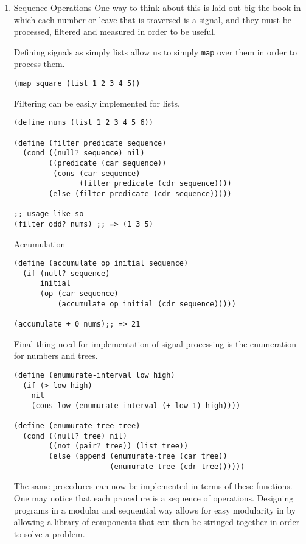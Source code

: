 \documentclass[11pt]{article}
\begin{document}
\begin{enumerate}
\item Sequence Operations
\label{sec:org70e3ef4}
One way to think about this is laid out big the book in which each
number or leave that is traversed is a signal, and they must be
processed, filtered and measured in order to be useful.

Defining signals as simply lists allow us to simply \texttt{map} over them in
order to process them.

\begin{verbatim}
(map square (list 1 2 3 4 5))
\end{verbatim}

Filtering can be easily implemented for lists.

\begin{verbatim}
(define nums (list 1 2 3 4 5 6))

(define (filter predicate sequence)
  (cond ((null? sequence) nil)
        ((predicate (car sequence))
         (cons (car sequence)
               (filter predicate (cdr sequence))))
        (else (filter predicate (cdr sequence)))))

;; usage like so
(filter odd? nums) ;; => (1 3 5)
\end{verbatim}

Accumulation

\begin{verbatim}
(define (accumulate op initial sequence)
  (if (null? sequence)
      initial
      (op (car sequence)
          (accumulate op initial (cdr sequence)))))

(accumulate + 0 nums);; => 21
\end{verbatim}

Final thing need for implementation of signal processing is the
enumeration for numbers and trees.

\begin{verbatim}
(define (enumurate-interval low high)
  (if (> low high)
    nil
    (cons low (enumurate-interval (+ low 1) high))))

(define (enumurate-tree tree)
  (cond ((null? tree) nil)
        ((not (pair? tree)) (list tree))
        (else (append (enumurate-tree (car tree))
                      (enumurate-tree (cdr tree))))))
\end{verbatim}

The same procedures can now be implemented in terms of these functions.
One may notice that each procedure is a sequence of operations.
Designing programs in a modular and sequential way allows for easy
modularity in by allowing a library of components that can then be
stringed together in order to solve a problem.


\end{enumerate}
\end{document}
